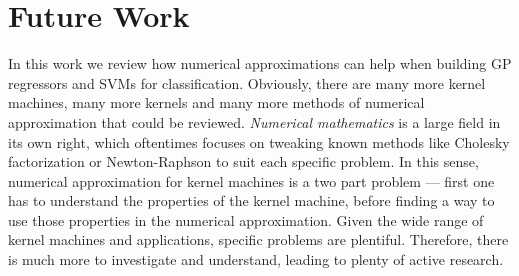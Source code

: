 \documentclass{article}
\theoremstyle{plain}
\theoremstyle{definition}
\theoremstyle{remark}
\begin{document}
\section{Future Work}
In this work we review how numerical approximations can help when building GP regressors and SVMs for classification.
Obviously, there are many more kernel machines, many more kernels and many more methods of numerical approximation that could be reviewed.
\textit{Numerical mathematics} is a large field in its own right, which oftentimes focuses on tweaking known methods like Cholesky factorization or Newton-Raphson to suit each specific problem.
In this sense, numerical approximation for kernel machines is a two part problem — first one has to understand the properties of the kernel machine, before finding a way to use those properties in the numerical approximation.
Given the wide range of kernel machines and applications, specific problems are plentiful.
Therefore, there is much more to investigate and understand, leading to plenty of active research.


\printbibliography
\end{document}
